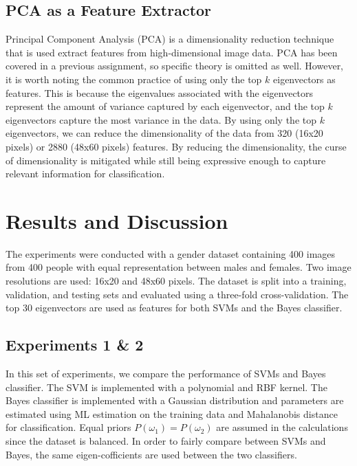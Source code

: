 \documentclass[12pt, letterpaper]{article}
\begin{document}
\subsection{PCA as a Feature Extractor}
Principal Component Analysis (PCA) is a dimensionality reduction technique that is
used extract features from high-dimensional image data. PCA has been covered in a
previous assignment, so specific theory is omitted as well. However, it is worth noting
the common practice of using only the top $k$ eigenvectors as features. This is because the
eigenvalues associated with the eigenvectors represent the amount of variance captured by each
eigenvector, and the top $k$ eigenvectors capture the most variance in the data. By using only
the top $k$ eigenvectors, we can reduce the dimensionality of the data from 320 (16x20 pixels)
or 2880 (48x60 pixels) features. By reducing the dimensionality, the curse of dimensionality
is mitigated while still being expressive enough to capture relevant information for
classification.

\section{Results and Discussion}
\label{sec:results}


The experiments were conducted with a gender dataset containing 400 images from 400 people
with equal representation between males and females. Two image resolutions are used: 16x20
and 48x60 pixels. The dataset is split into a training, validation, and testing
sets and evaluated using a three-fold cross-validation. The top 30 eigenvectors are used
as features for both SVMs and the Bayes classifier.

\subsection{Experiments 1 \& 2}

In this set of experiments, we compare the performance of SVMs and Bayes classifier. The SVM is
implemented with a polynomial and RBF kernel. The Bayes classifier is implemented with a Gaussian
distribution and parameters are estimated using ML estimation on the training data and Mahalanobis
distance for classification. Equal priors $P(\omega_1) = P(\omega_2)$ are assumed in the
calculations since the dataset is balanced. In order to fairly compare between SVMs and Bayes,
the same eigen-cofficients are used between the two classifiers.
\end{document}
